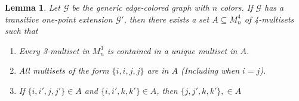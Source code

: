 \documentclass[10pt,a4paper]{amsart}
\newtheorem{lemma}{Lemma}
\def\graph{\mathcal{G}}
\newcommand{\set}[1]{\{#1 \}}
\begin{document}
\begin{lemma}\label{existence of palettes}
    Let $\graph$ be the generic edge-colored graph with $n$ colors. If $\graph$ has a transitive one-point extension $\graph'$, then there exists a set $A \subseteq M_n^4$ of 4-multisets such that
    \begin{enumerate}
        \item Every 3-multiset in $M_n^3$ is contained in a unique multiset in $A$.

        \item All multisets of the form $\set{i, i, j, j}$ are in $A$ (Including when $i = j$).

        \item If $\set{i, i', j, j'} \in A$ and $\set{i, i', k, k'} \in A$, then $\set{j, j', k, k'}, \in A$
    \end{enumerate}
\end{lemma}
\end{document}
